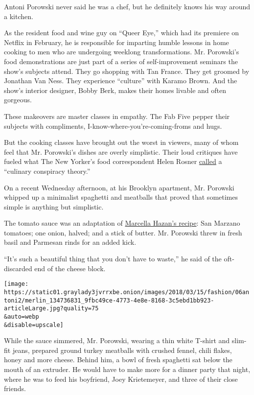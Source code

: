 Antoni Porowski never said he was a chef, but he definitely knows his
way around a kitchen.

As the resident food and wine guy on ``Queer Eye,'' which had its
premiere on Netflix in February, he is responsible for imparting humble
lessons in home cooking to men who are undergoing weeklong
transformations. Mr. Porowski's food demonstrations are just part of a
series of self-improvement seminars the show's subjects attend. They go
shopping with Tan France. They get groomed by Jonathan Van Ness. They
experience ``culture'' with Karamo Brown. And the show's interior
designer, Bobby Berk, makes their homes livable and often gorgeous.

These makeovers are master classes in empathy. The Fab Five pepper their
subjects with compliments, I-know-where-you're-coming-froms and hugs.

But the cooking classes have brought out the worst in viewers, many of
whom feel that Mr. Porowski's dishes are overly simplistic. Their loud
critiques have fueled what The New Yorker's food correspondent Helen
Rosner
\href{https://www.newyorker.com/culture/annals-of-gastronomy/the-exquisite-blankness-and-highly-suspect-guacamole-of-antoni-porowski-from-queer-eye}{called}
a ``culinary conspiracy theory.''

On a recent Wednesday afternoon, at his Brooklyn apartment, Mr. Porowski
whipped up a minimalist spaghetti and meatballs that proved that
sometimes simple is anything but simplistic.

The tomato sauce was an adaptation of
\href{https://cooking.nytimes3xbfgragh.onion/recipes/1015178-marcella-hazans-tomato-sauce}{Marcella
Hazan's recipe}: San Marzano tomatoes; one onion, halved; and a stick of
butter. Mr. Porowski threw in fresh basil and Parmesan rinds for an
added kick.

``It's such a beautiful thing that you don't have to waste,'' he said of
the oft-discarded end of the cheese block.

\texttt{[image: https://static01.graylady3jvrrxbe.onion/images/2018/03/15/fashion/06antoni2/merlin\_134736831\_9fbc49ce-4773-4e8e-8168-3c5ebd1bb923-articleLarge.jpg?quality=75\\\&auto=webp\\\&disable=upscale]}

While the sauce simmered, Mr. Porowski, wearing a thin white T-shirt and
slim-fit jeans, prepared ground turkey meatballs with crushed fennel,
chili flakes, honey and more cheese. Behind him, a bowl of fresh
spaghetti sat below the mouth of an extruder. He would have to make more
for a dinner party that night, where he was to feed his boyfriend, Joey
Krietemeyer, and three of their close friends.

